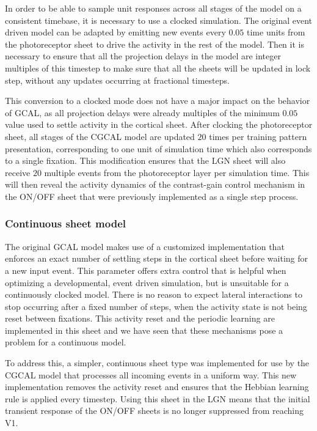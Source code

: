 \documentclass[phd,ianc,twoside]{infthesis}
\begin{document}
In order to be able to sample unit responses across all stages of the
model on a consistent timebase, it is necessary to use a clocked
simulation. The original event driven model can be adapted by emitting
new events every $0.05$ time units from the photoreceptor sheet to drive
the activity in the rest of the model. Then it is necessary to ensure
that all the projection delays in the model are integer multiples of
this timestep to make sure that all the sheets will be updated in
lock step, without any updates occurring at fractional timesteps.

This conversion to a clocked mode does not have a major impact on the
behavior of GCAL, as all projection delays were already multiples
of the minimum $0.05$ value used to settle activity in the cortical
sheet. After clocking the photoreceptor sheet, all stages of the CGCAL
model are updated $20$ times per training pattern presentation,
corresponding to one unit of simulation time which also corresponds to a
single fixation. This modification ensures that the LGN sheet will also
receive $20$ multiple events from the photoreceptor layer per simulation
time. This will then reveal the activity dynamics of the contrast-gain
control mechanism in the ON/OFF sheet that were previously implemented
as a single step process.


\subsubsection*{Continuous sheet model}

The original GCAL model makes use of a customized implementation that
enforces an exact number of settling steps in the cortical sheet before
waiting for a new input event. This parameter offers extra control that
is helpful when optimizing a developmental, event driven simulation, but
is unsuitable for a continuously clocked model. There is no
reason to expect lateral interactions to stop occurring after a fixed
number of steps, when the activity state is not being reset between
fixations. This activity reset and the periodic learning are implemented
in this sheet and we have seen that these mechanisms pose a problem for
a continuous model.

To address this, a simpler, continuous sheet type was implemented for
use by the CGCAL model that processes all incoming events in a uniform
way. This new implementation removes the activity reset and ensures that
the Hebbian learning rule is applied every timestep. Using this sheet in
the LGN means that the initial transient response of the ON/OFF sheets
is no longer suppressed from reaching V1.
\end{document}
